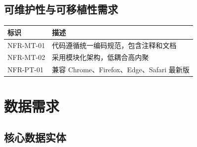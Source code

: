 \documentclass[12pt,a4paper,UTF8]{ctexart}
\begin{document}
\subsection{可维护性与可移植性需求}

\begin{longtable}{p{}|p{}}
    \toprule
    \textbf{标识} & \textbf{描述} \\
    \midrule
    \endhead
    \bottomrule
    \endfoot

    NFR-MT-01 & 代码遵循统一编码规范，包含注释和文档 \\
    NFR-MT-02 & 采用模块化架构，低耦合高内聚 \\
    NFR-PT-01 & 兼容 Chrome、Firefox、Edge、Safari 最新版 \\
\end{longtable}

\section{数据需求}

\subsection{核心数据实体}
\end{document}
